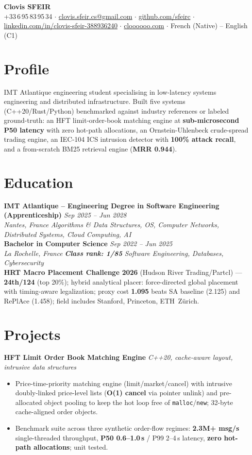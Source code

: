 \documentclass[10pt]{article}
\newcommand{\entry}[4]{%
  \noindent\textbf{#1} \hfill \textit{#2} \\
  \textit{#3} \hfill \textit{#4}\\[-0.3em]
}
\newcommand{\projectentry}[2]{%
  \noindent\textbf{#1} \hfill \textit{#2}\\[-0.3em]
}
\begin{document}
\fontsize{9.3pt}{11pt}\selectfont
\begin{center}
  {\LARGE \textbf{Clovis SFEIR}}\\[0.3em]
  +33\,6\,95\,83\,95\,34 \;$\cdot$\; \href{mailto:clovis.sfeir.cs@gmail.com}{clovis.sfeir.cs@gmail.com} \;$\cdot$\;
  \href{https://github.com/sfeirc}{github.com/sfeirc} \;$\cdot$\;
  \href{https://linkedin.com/in/clovis-sfeir-388936240}{linkedin.com/in/clovis-sfeir-388936240} \;$\cdot$\;
  \href{https://cloooooo.com}{cloooooo.com} \;$\cdot$\; French (Native) -- English (C1)
\end{center}

\section*{Profile}
IMT Atlantique engineering student specialising in low-latency systems engineering and distributed infrastructure. Built five systems (C++20/Rust/Python) benchmarked against industry references or labeled ground-truth: an HFT limit-order-book matching engine at \textbf{sub-microsecond P50 latency} with zero hot-path allocations, an Ornstein-Uhlenbeck crude-spread trading engine, an IEC-104 ICS intrusion detector with \textbf{100\% attack recall}, and a from-scratch BM25 retrieval engine (\textbf{MRR 0.944}).

\section*{Education}
\entry{IMT Atlantique -- Engineering Degree in Software Engineering (Apprenticeship)}{Sep 2025 -- Jun 2028}{Nantes, France}{Algorithms \& Data Structures, OS, Computer Networks, Distributed Systems, Cloud Computing, AI}
\entry{Bachelor in Computer Science}{Sep 2022 -- Jun 2025}{La Rochelle, France}{\textbf{Class rank: 1/85} \textbar{} Software Engineering, Databases, Cybersecurity}
\noindent\textbf{HRT Macro Placement Challenge 2026} (Hudson River Trading/Partcl) --- \textbf{24th/124} (top 20\%); hybrid analytical placer: force-directed global placement with timing-aware legalization; proxy cost \textbf{1.095} beats SA baseline (2.125) and RePlAce (1.458); field includes Stanford, Princeton, ETH~Z\"urich.

\section*{Projects}

\projectentry{HFT Limit Order Book Matching Engine}{C++20, cache-aware layout, intrusive data structures}
\begin{itemize}
  \item Price-time-priority matching engine (limit/market/cancel) with intrusive doubly-linked price-level lists (\textbf{O(1) cancel} via pointer unlink) and pre-allocated object pooling to keep the hot loop free of \texttt{malloc}/\texttt{new}; 32-byte cache-aligned order objects.
  \item Benchmark suite across three synthetic order-flow regimes: \textbf{2.3M+ msg/s} single-threaded throughput, \textbf{P50 0.6--1.0\,\textmu s} / P99 2--4\,\textmu s latency, \textbf{zero hot-path allocations}; unit tested.
\end{itemize}
\end{document}
